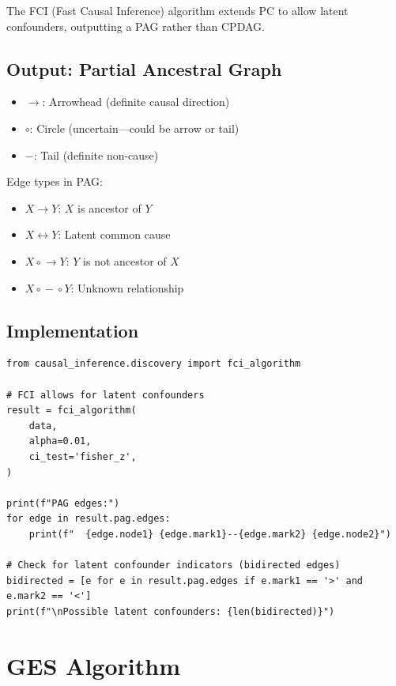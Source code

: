 The FCI (Fast Causal Inference) algorithm extends PC to allow latent confounders, outputting a PAG rather than CPDAG.

\subsection{Output: Partial Ancestral Graph}

\begin{definition}
\begin{itemize}
    \item $\to$: Arrowhead (definite causal direction)
    \item $\circ$: Circle (uncertain---could be arrow or tail)
    \item $-$: Tail (definite non-cause)
\end{itemize}
Edge types in PAG:
\begin{itemize}
    \item $X \to Y$: $X$ is ancestor of $Y$
    \item $X \leftrightarrow Y$: Latent common cause
    \item $X \circ\!\to Y$: $Y$ is not ancestor of $X$
    \item $X \circ\!-\!\circ Y$: Unknown relationship
\end{itemize}
\end{definition}

\subsection{Implementation}

\begin{verbatim}
from causal_inference.discovery import fci_algorithm

# FCI allows for latent confounders
result = fci_algorithm(
    data,
    alpha=0.01,
    ci_test='fisher_z',
)

print(f"PAG edges:")
for edge in result.pag.edges:
    print(f"  {edge.node1} {edge.mark1}--{edge.mark2} {edge.node2}")

# Check for latent confounder indicators (bidirected edges)
bidirected = [e for e in result.pag.edges if e.mark1 == '>' and e.mark2 == '<']
print(f"\nPossible latent confounders: {len(bidirected)}")
\end{verbatim}


\section{GES Algorithm}

